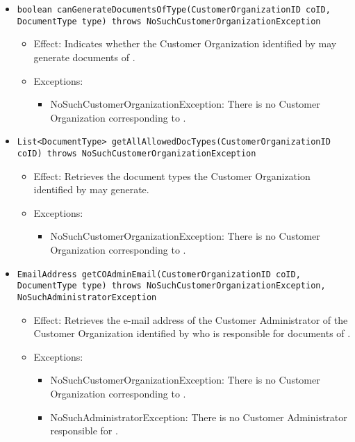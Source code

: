 \begin{itemize}
\begin{itemize}
		\item \texttt{boolean canGenerateDocumentsOfType(CustomerOrganizationID coID, DocumentType type) throws NoSuchCustomerOrganizationException}
		    \begin{itemize}
                \item Effect: Indicates whether the Customer Organization identified by  may generate documents of .
                \item Exceptions:
				\begin{itemize}
					\item NoSuchCustomerOrganizationException: There is no Customer Organization corresponding to .
				\end{itemize}
            \end{itemize}

		\item \texttt{List<DocumentType> getAllAllowedDocTypes(CustomerOrganizationID coID) throws NoSuchCustomerOrganizationException}
		    \begin{itemize}
                \item Effect: Retrieves the document types the Customer Organization identified by  may generate.
                \item Exceptions:
				\begin{itemize}
					\item NoSuchCustomerOrganizationException: There is no Customer Organization corresponding to .
				\end{itemize}
            \end{itemize}

		\item \texttt{EmailAddress getCOAdminEmail(CustomerOrganizationID coID, DocumentType type) throws NoSuchCustomerOrganizationException, NoSuchAdministratorException}
		    \begin{itemize}
                \item Effect: Retrieves the e-mail address of the Customer Administrator of the Customer Organization identified by  who is responsible for documents of .
                \item Exceptions:
				\begin{itemize}
					\item NoSuchCustomerOrganizationException: There is no Customer Organization corresponding to .
					\item NoSuchAdministratorException: There is no Customer Administrator responsible for .
				\end{itemize}
            \end{itemize}


\end{itemize}
\end{itemize}

